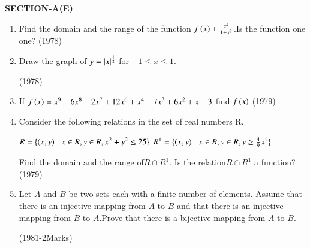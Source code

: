 \documentclass[journal,12pt,twocolumn]{IEEEtran}
\theoremstyle{remark}
\begin{document}
\begin{large}
      \textbf{SECTION-A(E)}
\end{large}
\begin{enumerate}
\item Find the domain and the range of the function $f\left(x\right)+\frac{x^2}{1+x^2}$.Is the function one one? 
\hfill(1978)
\item Draw the graph of $y=\left\vert x\right\vert^{\frac{1}{2}}$ for $-1\le x \le1.$

\hfill(1978)
\item If $f\left(x\right)=x^9-6x^8-2x^7+12x^6+x^4-7x^3+6x^2+x-3$ find $f\left(x\right)$
\hfill(1979)
\item Consider the following relations in the set of real numbers R.

$R=\{\left(x,y\right):x\in R,y\in R,x^2+y^2\le25\}$
$R^1=\{\left(x,y\right):x\in R,y\in R,y\ge\frac{4}{9}x^2\}$

Find the domain and the range of$ R\cap R^1.$ Is the relation$ R\cap R^1$ a function? 
\hfill(1979)
\item Let $A$ and $B$ be two sets each with a finite number of elements. Assume that there is an injective mapping from $A$ to $B$ and that there is an injective mapping from $B$ to $A$.Prove that there is a bijective mapping from $A$ to $B$.
	
\hfill(1981-2Marks)
\end{enumerate}
\end{document}
